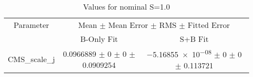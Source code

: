 \begin{table}
\centering
\caption{Values for nominal S=1.0}
\begin{tabular}{ccc}
\toprule
Parameter 	& \multicolumn{2}{c}{Mean $\pm$ Mean Error $\pm$ RMS $\pm$ Fitted Error}\\
 	& B-Only Fit & S+B Fit\\
\midrule
CMS\_scale\_j 	& \num{0.0966889} $\pm$ \num{0} $\pm$ \num{0} $\pm$ \num{0.0909254} 	& \num{-5.16855e-08} $\pm$ \num{0} $\pm$ \num{0} $\pm$ \num{0.113721}\\
\bottomrule
\end{tabular}
\end{table}